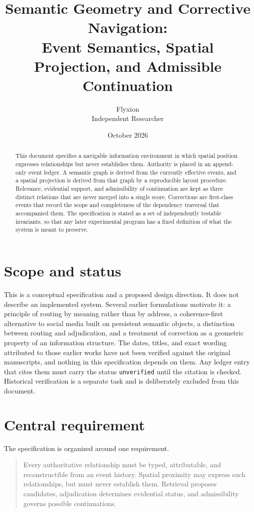 \documentclass[11pt]{article}
\title{Semantic Geometry and Corrective Navigation:\\
Event Semantics, Spatial Projection, and Admissible Continuation}
\author{Flyxion\\Independent Researcher}
\date{October 2026}
\theoremstyle{definition}
\newcommand{\ev}[1]{\texttt{#1}}
\begin{document}
\maketitle

\begin{abstract}
\noindent
This document specifies a navigable information environment in which spatial position expresses relationships but never establishes them. Authority is placed in an append-only event ledger. A semantic graph is derived from the currently effective events, and a spatial projection is derived from that graph by a reproducible layout procedure. Relevance, evidential support, and admissibility of continuation are kept as three distinct relations that are never merged into a single score. Corrections are first-class events that record the scope and completeness of the dependency traversal that accompanied them. The specification is stated as a set of independently testable invariants, so that any later experimental program has a fixed definition of what the system is meant to preserve.
\end{abstract}

\section{Scope and status}

This is a conceptual specification and a proposed design direction. It does not describe an implemented system. Several earlier formulations motivate it: a principle of routing by meaning rather than by address, a coherence-first alternative to social media built on persistent semantic objects, a distinction between routing and adjudication, and a treatment of correction as a geometric property of an information structure. The dates, titles, and exact wording attributed to those earlier works have not been verified against the original manuscripts, and nothing in this specification depends on them. Any ledger entry that cites them must carry the status \ev{unverified} until the citation is checked. Historical verification is a separate task and is deliberately excluded from this document.

\section{Central requirement}

The specification is organized around one requirement.

\begin{quote}
Every authoritative relationship must be typed, attributable, and reconstructible from an event history. Spatial proximity may express such relationships, but must never establish them. Retrieval proposes candidates, adjudication determines evidential status, and admissibility governs possible continuations.
\end{quote}
\end{document}
